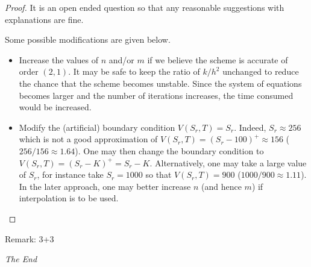 \documentclass[a4paper,12pt]{article}
\begin{document}
\begin{enumerate}
\begin{proof}
It is an open ended question so that any reasonable suggestions with explanations are fine.

Some possible modifications are given below.
\begin{itemize}
\item Increase the values of $n$ and/or $m$ if we believe the scheme is accurate of order $(2,1)$. It may be safe to keep the ratio of $k/h^2$ unchanged to reduce the chance that the scheme becomes unstable. Since the system of equations becomes larger and the number of iterations increases, the time consumed would be increased.

\item Modify the (artificial) boundary condition $V(S_r,T)=S_r$. Indeed, $S_r\approx 256$ which is not a good approximation of $V(S_r,T)=(S_r-100)^+\approx 156$ ($256/156\approx 1.64$). One may then change the boundary condition to $V(S_r,T)=(S_r-K)^+=S_r-K$. Alternatively, one may take a large value of $S_r$, for instance take $S_r=1000$ so that $V(S_r,T)=900$ ($1000/900\approx 1.11$). In the later approach, one may better increase $n$ (and hence $m$) if interpolation is to be used. \qedhere
\end{itemize}
\end{proof}

Remark: 3+3

\end{enumerate}


\vfill

\begin{center}{\it The End}\end{center}
\end{document}
